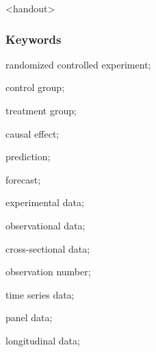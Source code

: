 

\begin{frame}<handout>
\frametitle{Keywords}
\begin{iteminline}
\item randomized controlled experiment;
\item control group;
\item treatment group;
\item causal effect;
\item prediction;
\item forecast;
\item experimental data;
\item observational data;
\item cross-sectional data;
\item observation number;
\item time series data;
\item panel data;
\item longitudinal data;
\end{iteminline}
\end{frame}


